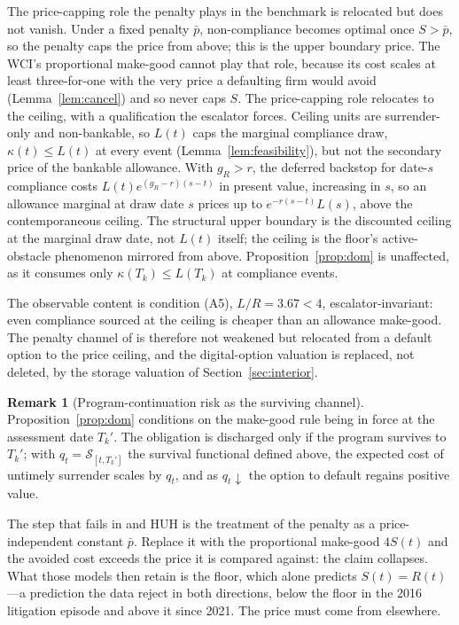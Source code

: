 \documentclass[11pt,letterpaper]{article}
\theoremstyle{plain}
\theoremstyle{definition}
\newtheorem{remark}[theorem]{Remark}
\numberwithin{equation}{section}
\begin{document}
The price-capping role the penalty plays in the benchmark is relocated but does not vanish. Under a fixed penalty $\bar p$, non-compliance becomes optimal once $S>\bar p$, so the penalty caps the price from above; this is the upper boundary \citet{hitzemann2018} price. The WCI's proportional make-good cannot play that role, because its cost scales at least three-for-one with the very price a defaulting firm would avoid (Lemma~\ref{lem:cancel}) and so never caps $S$. The price-capping role relocates to the ceiling, with a qualification the escalator forces. Ceiling units are surrender-only and non-bankable, so $L(t)$ caps the marginal compliance draw, $\kappa(t)\le L(t)$ at every event (Lemma~\ref{lem:feasibility}), but not the secondary price of the bankable allowance. With $g_R>r$, the deferred backstop for date-$s$ compliance costs $L(t)e^{(g_R-r)(s-t)}$ in present value, increasing in $s$, so an allowance marginal at draw date $s$ prices up to $e^{-r(s-t)}L(s)$, above the contemporaneous ceiling. The structural upper boundary is the discounted ceiling at the marginal draw date, not $L(t)$ itself; the ceiling is the floor's active-obstacle phenomenon mirrored from above. Proposition~\ref{prop:dom} is unaffected, as it consumes only $\kappa(T_k)\le L(T_k)$ at compliance events.

The observable content is condition (A5), $L/R=3.67<4$, escalator-invariant: even compliance sourced at the ceiling is cheaper than an allowance make-good. The penalty channel of \citet{hitzemann2018} is therefore not weakened but relocated from a default option to the price ceiling, and the digital-option valuation is replaced, not deleted, by the storage valuation of Section~\ref{sec:interior}.

\begin{remark}[Program-continuation risk as the surviving channel]\label{rem:continuation}
Proposition~\ref{prop:dom} conditions on the make-good rule being in force at the assessment date $T_k'$. The obligation is discharged only if the program survives to $T_k'$; with $q_t=\mathcal{S}_{[t,T_k']}$ the survival functional defined above, the expected cost of untimely surrender scales by $q_t$, and as $q_t\downarrow$ the option to default regains positive value.
\end{remark}

The step that fails in \citet{carmona2011} and HUH is the treatment of the penalty as a price-independent constant $\bar p$. Replace it with the proportional make-good $4S(t)$ and the avoided cost exceeds the price it is compared against: the claim collapses. What those models then retain is the floor, which alone predicts $S(t)=R(t)$---a prediction the data reject in both directions, below the floor in the 2016 litigation episode and above it since 2021. The price must come from elsewhere.
\end{document}
